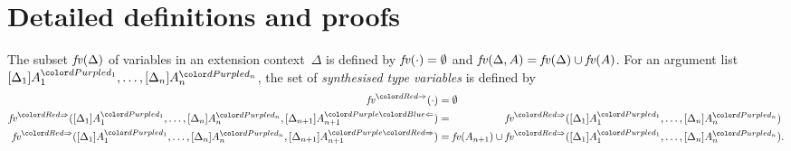 
\section{Detailed definitions and proofs}\label{sec:defs-proofs}

\begin{definition}\label{def:syn-var}
  The subset $\mathit{fv}(\Delta)$ of variables in an extension context~$\Delta$ is defined by\/ $\mathit{fv}(\cdot) = \emptyset$ and\/ $\mathit{fv}(\Delta, A) = \mathit{fv}(\Delta) \cup \mathit{fv}(A)$.
  For an argument list $\biargs$, the set of \emph{synthesised type variables} is defined by 
  \begin{align*}
    \synvar(\cdot)                   & = \emptyset  \\
    \synvar(\biargs, \chkbiarg[n+1]) & = \phantom{\fv(A_{n+1}) \cup {}} \synvar(\biargs) \\
    \synvar(\biargs, \synbiarg[n+1]) & = \fv(A_{n+1}) \cup           \synvar(\biargs).
  \end{align*}
\end{definition}
